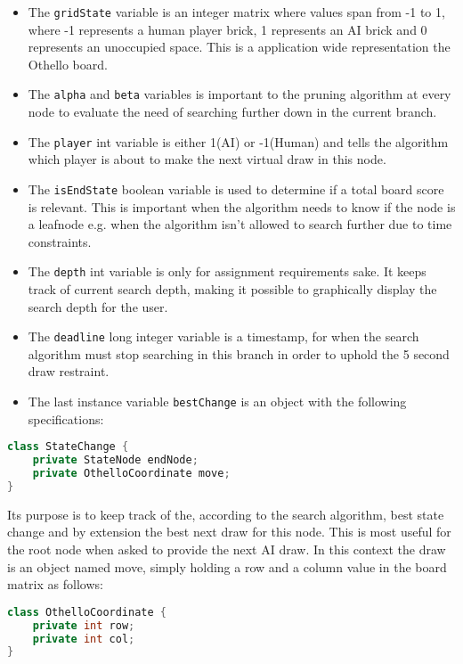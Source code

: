 \documentclass{article}
\begin{document}
\begin{itemize}
\item The \verb|gridState| variable is an integer matrix where values span from -1 to 1,
where -1 represents a human player brick, 1 represents an AI brick and 0 represents
an unoccupied space. This is a application wide representation the Othello board.

 \item The \verb|alpha| and \verb|beta| variables is important to the pruning algorithm at
every node to evaluate the need of searching further down in the current branch.

\item The \verb|player| int variable is either 1(AI) or -1(Human) and tells the algorithm
which player is about to make the next virtual draw in this node.

\item The \verb|isEndState| boolean variable is used to determine if a total board score
is relevant. This is important when the algorithm needs to know if the node is a
leafnode e.g. when the algorithm isn't allowed to search further due to time constraints.

\item The \verb|depth| int variable is only for assignment requirements sake. It keeps
track of current search depth, making it possible to graphically display the search depth for the user.

\item The \verb|deadline| long integer variable is a timestamp, for when the search
algorithm must stop searching in this branch in order to uphold the 5 second
draw restraint.

\item The last instance variable \verb|bestChange| is an object with the following specifications:
\end{itemize}

\begin{lstlisting}[language=Java]
class StateChange {
    private StateNode endNode;
    private OthelloCoordinate move;
}
\end{lstlisting}

Its purpose is to keep track of the, according to the search algorithm, best state
change and by extension the best next draw for this node. This is most useful
for the root node when asked to provide the next AI draw. In this context the draw
is an object named move, simply holding a row and a column value in the board matrix as follows:
\begin{lstlisting}[language=Java]
class OthelloCoordinate {
    private int row;
    private int col;
}
\end{lstlisting}
\end{document}
